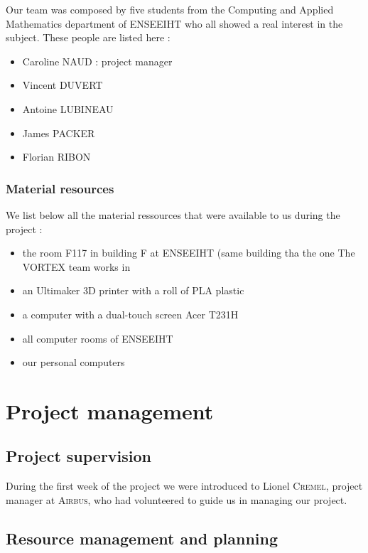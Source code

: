 \documentclass{report}
\begin{document}
Our team was composed by five students from the Computing and Applied Mathematics department of ENSEEIHT who all showed a real interest in the subject. These people are listed here :

\begin{itemize}
\item Caroline \textsc{NAUD} : project manager
\item Vincent \textsc{DUVERT}
\item Antoine \textsc{LUBINEAU}
\item James \textsc{PACKER}
\item Florian \textsc{RIBON}
\end{itemize}

\subsection{Material resources}

We list below all the material ressources that were available to us during the project :

\begin{itemize}
\item the room F117 in building F at ENSEEIHT (same building tha the one The \textsc{VORTEX} team works in
\item an Ultimaker 3D printer with a roll of PLA plastic
\item a computer with a dual-touch screen Acer T231H
\item all computer rooms of ENSEEIHT
\item our personal computers
\end{itemize}

\chapter{Project management}

\section{Project supervision}

During the first week of the project we were introduced to Lionel \textsc{Cremel}, project manager at \textsc{Airbus}, who had volunteered to guide us in managing our project.

\section{Resource management and planning}
\end{document}

